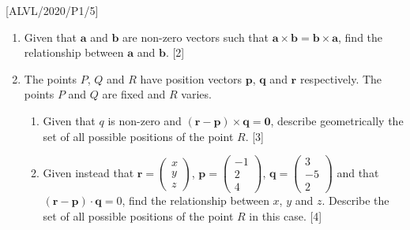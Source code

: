 \item {[}ALVL/2020/P1/5{]}
\begin{enumerate}
\item Given that $\mathbf{a}$ and $\mathbf{b}$ are non-zero vectors such
that $\mathbf{a}\times\mathbf{b}=\mathbf{b}\times\mathbf{a}$, find
the relationship between $\mathbf{a}$ and $\mathbf{b}$.\hfill{}
{[}2{]}
\item The points $P$, $Q$ and $R$ have position vectors $\mathbf{p}$,
$\mathbf{q}$ and $\mathbf{r}$ respectively. The points $P$ and
$Q$ are fixed and $R$ varies. 
\begin{enumerate}
\item Given that $q$ is non-zero and $\left(\mathbf{r}-\mathbf{p}\right)\times\mathbf{q}=\mathbf{0}$,
describe geometrically the set of all possible positions of the point
$R$.\hfill{} {[}3{]}
\item Given instead that $\mathbf{r}=\left(\begin{array}{c}
x\\
y\\
z
\end{array}\right)$, $\mathbf{p}=\left(\begin{array}{c}
-1\\
2\\
4
\end{array}\right)$, $\mathbf{q}=\left(\begin{array}{c}
3\\
-5\\
2
\end{array}\right)$ and that $\left(\mathbf{r}-\mathbf{p}\right)\cdot\mathbf{q}=0$,
find the relationship between $x$, $y$ and $z$. Describe the set
of all possible positions of the point $R$ in this case.\hfill{}
{[}4{]}
\end{enumerate}
\end{enumerate}

